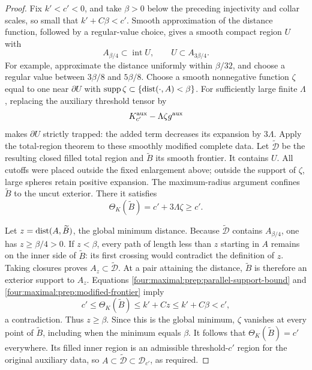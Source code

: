 \begin{proof}
Fix \(k'<c'<0\), and take \(\beta>0\) below the preceding
injectivity and collar scales, so small that
\(k'+C\beta<c'\).  Smooth approximation of the distance function,
followed by a regular-value choice, gives a smooth compact region
\(U\) with
\[
 A_{\beta/4}\subset\operatorname{int}U,
 \qquad U\subset A_{3\beta/4}.
\]
For example, approximate the distance uniformly within
\(\beta/32\), and choose a regular value between
\(3\beta/8\) and \(5\beta/8\).  Choose a smooth nonnegative
function \(\zeta\) equal to one near \(\partial U\) with
\(\operatorname{supp}\zeta\subset\{\operatorname{dist}(\cdot,A)<\beta\}\).
For sufficiently large finite \(\Lambda\), replacing the
auxiliary threshold tensor by
\[
 K_{c'}^{\rm aux}-\Lambda\zeta g^{\rm aux}
\]
makes \(\partial U\) strictly trapped: the added term decreases
its expansion by \(3\Lambda\).  Apply the total-region theorem
to these smoothly modified complete data.  Let \(\widetilde{\mathcal
D}\) be the resulting closed filled total region and
\(\widetilde B\) its smooth frontier.  It contains \(U\).
All cutoffs were placed outside the fixed enlargement above;
outside the support of \(\zeta\), large spheres retain positive
expansion.  The maximum-radius argument confines
\(\widetilde B\) to the uncut exterior.  There it satisfies
\begin{equation}
 \Theta_K(\widetilde B)=c'+3\Lambda\zeta\ge c'.
\label{four:maximal:prep:modified-frontier}
\end{equation}

Let \(z=\operatorname{dist}(A,\widetilde B)\), the global minimum distance.
Because \(\widetilde{\mathcal D}\) contains
\(A_{\beta/4}\), one has \(z\ge\beta/4>0\).
If \(z<\beta\), every path of length less than \(z\) starting
in \(A\) remains on the inner side of \(\widetilde B\): its
first crossing would contradict the definition of \(z\).
Taking closures proves \(A_z\subset\widetilde{\mathcal D}\).
At a pair attaining the distance, \(\widetilde B\) is therefore
an exterior support to \(A_z\).  Equations
\eqref{four:maximal:prep:parallel-support-bound} and
\eqref{four:maximal:prep:modified-frontier} imply
\[
 c'\le\Theta_K(\widetilde B)\le k'+Cz
                  \le k'+C\beta<c',
\]
a contradiction.  Thus \(z\ge\beta\).  Since this is the
global minimum, \(\zeta\) vanishes at every point of
\(\widetilde B\), including when the minimum equals \(\beta\).
It follows that \(\Theta_K(\widetilde B)=c'\) everywhere.
Its filled inner region is an admissible threshold-\(c'\) region
for the original auxiliary data, so
\(A\subset\widetilde{\mathcal D}\subset\mathcal D_{c'}\),
as required.
\end{proof}

